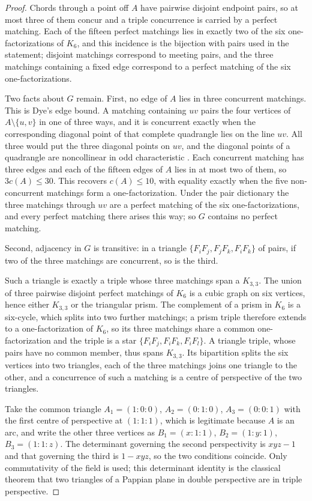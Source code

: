 \documentclass[11pt]{article}
\theoremstyle{definition}
\theoremstyle{remark}
\begin{document}
\begin{proof}
Chords through a point off $A$ have pairwise disjoint endpoint pairs, so at
most three of them concur and a triple concurrence is carried by a perfect
matching.  Each of the fifteen perfect matchings lies in exactly two of the
six one-factorizations of $K_6$, and this incidence is the bijection with
pairs used in the statement; disjoint matchings correspond to meeting
pairs, and the three matchings containing a fixed edge correspond to a
perfect matching of the six one-factorizations.

Two facts about $G$ remain.  First, no edge of $A$ lies in three concurrent
matchings.  This is Dye's edge bound.  A matching containing $uv$ pairs the
four vertices of $A\setminus\{u,v\}$ in one of three ways, and it is
concurrent exactly when the corresponding diagonal point of that complete
quadrangle lies on the line $uv$.  All three would put the three diagonal
points on $uv$, and the diagonal points of a quadrangle are noncollinear in
odd characteristic \cite[\S2.2, p.~274]{Dye1991}.  Each concurrent matching
has three edges and each of the fifteen edges of $A$ lies in at most two of
them, so $3c(A)\le30$.  This recovers $c(A)\le10$, with equality exactly when the five
non-concurrent matchings form a one-factorization.  Under the pair
dictionary the three matchings through $uv$ are a perfect matching of the
six one-factorizations, and every perfect matching there arises this way;
so $G$ contains no perfect matching.

Second, adjacency in $G$ is transitive: in a triangle
$\{F_iF_j,F_jF_k,F_iF_k\}$ of pairs, if two of the three matchings are
concurrent, so is the third.

Such a triangle is exactly a triple whose three matchings span a
$K_{3,3}$.  The union of three pairwise disjoint perfect matchings of $K_6$
is a cubic graph on six vertices, hence either $K_{3,3}$ or the triangular
prism.  The complement of a prism in $K_6$ is a six-cycle, which splits
into two further matchings; a prism triple therefore extends to a
one-factorization of $K_6$, so its three matchings share a common
one-factorization and the triple is a star $\{F_iF_j,F_iF_k,F_iF_l\}$.  A
triangle triple, whose pairs have no common member, thus spans $K_{3,3}$.
Its bipartition splits the six vertices into two triangles, each of the
three matchings joins one triangle to the other, and a concurrence of such
a matching is a centre of perspective of the two triangles.

Take the common triangle
$A_1=(1{:}0{:}0)$, $A_2=(0{:}1{:}0)$, $A_3=(0{:}0{:}1)$ with the first
centre of perspective at $(1{:}1{:}1)$, which is legitimate because $A$ is
an arc, and write the other three vertices as $B_1=(x{:}1{:}1)$,
$B_2=(1{:}y{:}1)$, $B_3=(1{:}1{:}z)$.  The determinant governing the second
perspectivity is $xyz-1$ and that governing the third is $1-xyz$, so the
two conditions coincide.  Only commutativity of the field is used; this
determinant identity is the classical theorem that two triangles of a
Pappian plane in double perspective are in triple perspective.


\end{proof}
\end{document}
